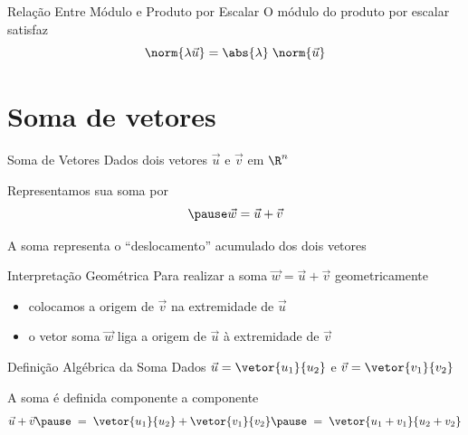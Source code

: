 \documentclass[fleqn,utf8,aspectratio=169,12pt]{beamer}
\begin{document}
\begin{frame}{Relação Entre Módulo e Produto por Escalar}
  O módulo do produto por escalar satisfaz
  \[
    \norm{\lambda\vec{u}}
    =
    \abs{\lambda} \; \norm{\vec{u}}
  \]
\end{frame}




\section{Soma de vetores}

\begin{frame}{Soma de Vetores}
  Dados dois vetores
  \(
    \vec{u}
  \)
  e
  \(
    \vec{v}
  \)
  em \(\R^n\)

  \pause
  Representamos sua soma por
  \[
    \pause
    \vec{w} = \vec{u} + \vec{v}
  \]

  \pause
  A soma representa o ``deslocamento'' acumulado dos dois vetores
\end{frame}

\begin{frame}{Interpretação Geométrica}
  Para realizar a soma
  \(
    \vec{w} = \vec{u}+\vec{v}
  \)
  geometricamente
  \pause
  \begin{itemize}
      \item colocamos a origem de $\vec{v}$ na extremidade de $\vec{u}$
      \pause
      \item o vetor soma \(\vec{w}\) liga a origem de $\vec{u}$ à extremidade de $\vec{v}$
  \end{itemize}
\end{frame}


\begin{frame}{Definição Algébrica da Soma}
  Dados
  \(
    \vec{u} = \vetor{u_1}{u_2}
  \)
  e
  \(
    \vec{v} = \vetor{v_1}{v_2}
  \)

  \pause
  \medskip
  A soma é definida componente a componente
  \pause
  \[
    \vec{u}+\vec{v}
    \pause
    \;=\; \vetor{u_1}{u_2} + \vetor{v_1}{v_2}
    \pause
    \;=\; \vetor{u_1+v_1}{u_2+v_2}
  \]
\end{frame}
\end{document}
